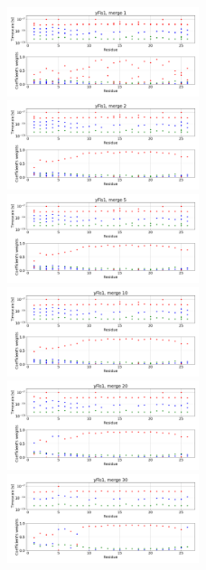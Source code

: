 \documentclass[12pt]{article}
\begin{document}
\begin{figure}
\centering
\includegraphics[width=0.5\textwidth]{yFis1_1.png}
\includegraphics[width=0.5\textwidth]{yFis1_2.png}
\includegraphics[width=0.5\textwidth]{yFis1_5.png}
\includegraphics[width=0.5\textwidth]{yFis1_10.png}
\includegraphics[width=0.5\textwidth]{yFis1_20.png}
\includegraphics[width=0.5\textwidth]{yFis1_30.png}
\end{figure}
\end{document}
